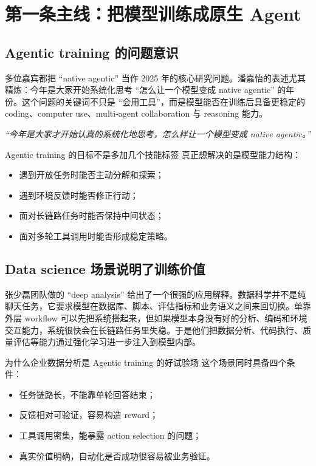 \section{第一条主线：把模型训练成原生 Agent}

\subsection{Agentic training 的问题意识}
多位嘉宾都把 ``native agentic'' 当作 2025 年的核心研究问题。潘嘉怡的表述尤其精炼：今年是大家开始系统化思考 ``怎么让一个模型变成 native agentic'' 的年份。这个问题的关键词不只是 ``会用工具''，而是模型能否在训练后具备更稳定的 coding、computer use、multi-agent collaboration 与 reasoning 能力。

\textit{``今年是大家才开始认真的系统化地思考，怎么样让一个模型变成 native agentic。''}

\begin{importantbox}{Agentic training 的目标不是多加几个技能标签}
真正想解决的是模型能力结构：
\begin{itemize}
  \item 遇到开放任务时能否主动分解和探索；
  \item 遇到环境反馈时能否修正行动；
  \item 面对长链路任务时能否保持中间状态；
  \item 面对多轮工具调用时能否形成稳定策略。
\end{itemize}
\end{importantbox}

\subsection{Data science 场景说明了训练价值}
张少磊团队做的 ``deep analysis'' 给出了一个很强的应用解释。数据科学并不是纯聊天任务，它要求模型在数据库、脚本、评估指标和业务语义之间来回切换。单靠外层 workflow 可以先把系统搭起来，但如果模型本身没有好的分析、编码和环境交互能力，系统很快会在长链路任务里失稳。于是他们把数据分析、代码执行、质量评估等能力通过强化学习进一步注入到模型内部。

\begin{knowledgebox}{为什么企业数据分析是 Agentic training 的好试验场}
这个场景同时具备四个条件：
\begin{itemize}
  \item 任务链路长，不能靠单轮回答结束；
  \item 反馈相对可验证，容易构造 reward；
  \item 工具调用密集，能暴露 action selection 的问题；
  \item 真实价值明确，自动化是否成功很容易被业务验证。
\end{itemize}
\end{knowledgebox}

